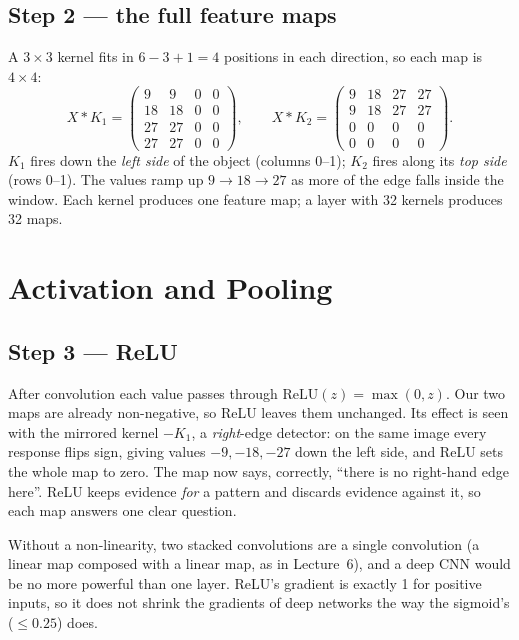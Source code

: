 \documentclass[11pt]{article}
\begin{document}
\subsection{Step 2 --- the full feature maps}
A $3\times3$ kernel fits in $6-3+1=4$ positions in each direction, so each map is $4\times4$:
\[X*K_1=\begin{pmatrix}9&9&0&0\\18&18&0&0\\27&27&0&0\\27&27&0&0\end{pmatrix},\qquad X*K_2=\begin{pmatrix}9&18&27&27\\9&18&27&27\\0&0&0&0\\0&0&0&0\end{pmatrix}.\]
$K_1$ fires down the \emph{left side} of the object (columns 0--1); $K_2$ fires along its \emph{top side} (rows 0--1). The values ramp up $9\to18\to27$ as more of the edge falls inside the window. Each kernel produces one feature map; a layer with 32 kernels produces 32 maps.

\section{Activation and Pooling}\label{sec:pool}
\subsection{Step 3 --- ReLU}
After convolution each value passes through $\text{ReLU}(z)=\max(0,z)$. Our two maps are already non-negative, so ReLU leaves them unchanged. Its effect is seen with the mirrored kernel $-K_1$, a \emph{right}-edge detector: on the same image every response flips sign, giving values $-9,-18,-27$ down the left side, and ReLU sets the whole map to zero. The map now says, correctly, ``there is no right-hand edge here''. ReLU keeps evidence \emph{for} a pattern and discards evidence against it, so each map answers one clear question.

Without a non-linearity, two stacked convolutions are a single convolution (a linear map composed with a linear map, as in Lecture~6), and a deep CNN would be no more powerful than one layer. ReLU's gradient is exactly 1 for positive inputs, so it does not shrink the gradients of deep networks the way the sigmoid's ($\le0.25$) does.
\end{document}
